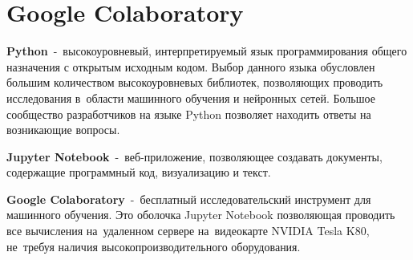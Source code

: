 \section{Google Colaboratory}\label{section:google_colab}

\textbf{Python}\cite{bib:python}~-~высокоуровневый, интерпретируемый язык программирования общего назначения с открытым исходным кодом.
Выбор данного языка обусловлен большим количеством высокоуровневых библиотек, позволяющих проводить исследования в~области машинного обучения и нейронных сетей.
Большое сообщество разработчиков на языке Python позволяет находить ответы на возникающие вопросы\cite{bib:why_python}.

\textbf{Jupyter Notebook}\cite{bib:jupyter}~-~веб-приложение, позволяющее создавать документы, содержащие программный код, визуализацию и текст.

\textbf{Google Colaboratory}\cite{bib:colab_settings}~-~бесплатный исследовательский инструмент для машинного обучения.
Это оболочка Jupyter Notebook позволяющая проводить все вычисления на~удаленном сервере на~видеокарте NVIDIA Tesla K80\cite{bib:nvidia_k80}, не~требуя наличия высокопроизводительного оборудования.

